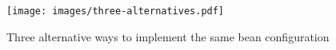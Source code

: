 \begin{figure}
    \centering
    \vspace{-1em}
    \texttt{[image: images/three-alternatives.pdf]}
    \vspace{-2.5em}
    \caption{{Three alternative ways to implement the same bean configuration}}
    \label{fig:examples}
    \vspace{-1.5em}
\end{figure}
\begin{comment}
\begin{lstlisting}[label = {lst:examples}, caption = Three alternative ways to implement the same bean configuration]
(*\bf (a) XML-based configuration*)
<?xml version="1.0" encoding="UTF-8"?>
<beans xmlns="http://www.springframework.org/schema/beans" ... >
  <bean id = "infoMessage" class="InfoMessage"/>
  <bean name="messageRenderer" class="MessageRenderer">
    <constructor-arg name="message" ref="infoMessage"/>
  </bean>
</beans>

(*\bf (b) Annotation-based configuration*)
import org.springframework.context.annotation.*; 
@Configuration
public class AppConfig {
  @Bean
  public InfoMessage infoMessage() {
    return new InfoMessage();
  }
  @Bean
  public MessageRenderer messageRenderer() {
    return new MessageRenderer(infoMessage());
  } }
  
(*\bf (c) Configuration based on both XML and annotations*)  
my-bean.xml:
<?xml version="1.0" encoding="UTF-8"?>
<beans xmlns="http://www.springframework.org/schema/beans" ... >
  <bean id = "infoMessage" class="InfoMessage"/>
</beans>

AppConfig.java:
import org.springframework.context.annotation.*;
@Configuration
@ImportResource(location = {"classpath:my-bean.xml"})
public class AppConfig {
  @Bean
  public MessageRenderer messageRenderer() {
    ApplicationContext context = new AnnotationConfigApplicationContext(ApplicationConfig.class);
    return new MessageRenderer(context.getBean("infoMessage"));
  } }
\end{lstlisting}
\end{comment}

\vspace{-0.5em}
